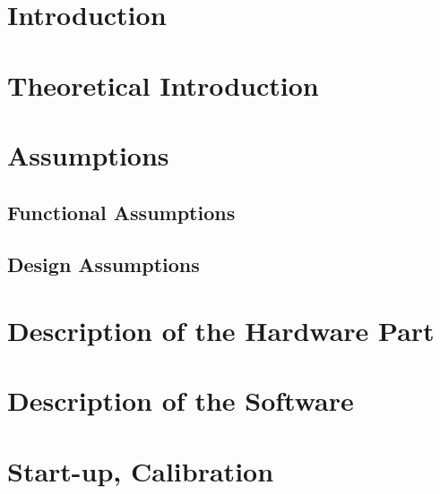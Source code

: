 \documentclass[12pt]{article}
\begin{document}
	\tableofcontents
	\newpage
	
	\section{Introduction}
	
	\section{Theoretical Introduction}
	
	\section{Assumptions}
	\subsection{Functional Assumptions}
	\subsection{Design Assumptions}
	
	\section{Description of the Hardware Part}
	
	\section{Description of the Software}
	
	\section{Start-up, Calibration}
	
\end{document}
